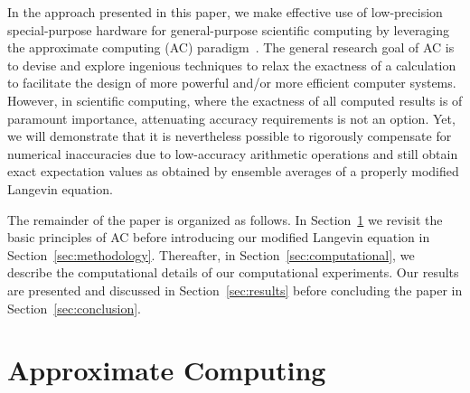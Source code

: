 \documentclass[format=acmsmall,review,timestamp,urlbreakonhyphens]{acmart}
\begin{document}
In the approach presented in this paper, we make effective use of low-precision special-purpose hardware for general-purpose scientific computing by leveraging the approximate computing (AC) paradigm~\cite{KlavikMalossiBekasEtAl2014, PlesslAC}. The general research goal of AC is to devise and explore ingenious techniques to relax the exactness of a calculation to facilitate the design of more powerful and/or more efficient computer systems. However, in scientific computing, where the exactness of all computed results is of paramount importance, attenuating accuracy requirements is not an option. Yet, we will demonstrate that it is nevertheless possible to rigorously compensate for numerical inaccuracies due to low-accuracy arithmetic operations and still obtain exact expectation values as obtained by ensemble averages of a properly modified Langevin equation.


The remainder of the paper is organized as follows. In Section~\ref{sec:ac} we revisit the basic principles of AC before introducing our modified Langevin equation in Section~\ref{sec:methodology}. Thereafter, in Section~\ref{sec:computational}, we describe the computational details of our computational experiments. Our results are presented and discussed in Section~\ref{sec:results} before concluding the paper in Section~\ref{sec:conclusion}.


\section{Approximate Computing}
\label{sec:ac}
\end{document}
